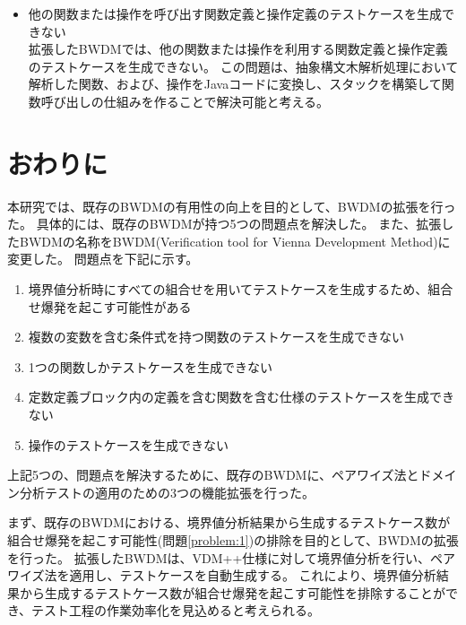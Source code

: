 \documentclass[uplatex, report, a4j, 10pt]{jsbook}
\newcommand\ttt[1]{\texttt{#1}}
\newcommand{\tool}{BWDM}
\newcommand{\toolFullName}{Verification tool for Vienna Development Method}
\begin{document}
\begin{itemize}
  \item 他の関数または操作を呼び出す関数定義と操作定義のテストケースを生成できない\\
        拡張したBWDMでは、他の関数または操作を利用する関数定義と操作定義のテストケースを生成できない。
        この問題は、抽象構文木解析処理において解析した関数、および、操作をJavaコードに変換し、スタックを構築して関数呼び出しの仕組みを作ることで解決可能と考える。
\end{itemize}

\chapter{おわりに} \label{cha:Conclusion}
本研究では、既存のBWDMの有用性の向上を目的として、BWDMの拡張を行った。
具体的には、既存のBWDMが持つ5つの問題点を解決した。
また、拡張したBWDMの名称を\tool{}(\toolFullName{})に変更した。
問題点を下記に示す。

\begin{enumerate}[label=(\alph*)]
  \item 境界値分析時にすべての組合せを用いてテストケースを生成するため、組合せ爆発を起こす可能性がある
  \item 複数の変数を含む条件式を持つ関数のテストケースを生成できない
  \item 1つの関数しかテストケースを生成できない
  \item 定数定義ブロック内の定義を含む関数を含む仕様のテストケースを生成できない
  \item 操作のテストケースを生成できない
\end{enumerate}

上記5つの、問題点を解決するために、既存のBWDMに、ペアワイズ法とドメイン分析テストの適用のための3つの機能拡張を行った。

まず、既存のBWDMにおける、境界値分析結果から生成するテストケース数が組合せ爆発を起こす可能性(問題\ref{problem:1})の排除を目的として、BWDMの拡張を行った。
拡張したBWDMは、VDM++仕様に対して境界値分析を行い、ペアワイズ法を適用し、テストケースを自動生成する。
これにより、境界値分析結果から生成するテストケース数が組合せ爆発を起こす可能性を排除することができ、テスト工程の作業効率化を見込めると考えられる。
\end{document}
